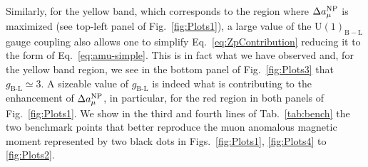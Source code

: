 \documentclass[a4paper,11pt]{article}
\renewcommand{\[}{\left[}
\renewcommand{\]}{\right]}
\newcommand{\U}[1]{\mathrm{U}(1)_{\mathrm{#1}}}			%
\newcommand{\ro}[1]{\textrm{#1}}
\begin{document}
Similarly, for the yellow band, which corresponds to the region where $\Delta a_\mu^{\rm NP}$ is maximized (see top-left panel of Fig.~\ref{fig:Plots1}), a large value of the $\U{B-L}$ gauge coupling also allows one to simplify Eq.~\eqref{eq:ZpContribution} reducing it to the form of Eq.~\eqref{eq:amu-simple}. This is in fact what we have observed and, for the yellow band region, we see in the bottom panel of Fig.~\ref{fig:Plots3} that $g_\ro{B-L} \simeq 3$. A sizeable value of $g_\ro{B-L}$ is indeed what is contributing to the enhancement of $\Delta a_\mu^{\rm NP}$, in particular, for the red region in both panels of Fig.~\ref{fig:Plots1}. We show in the third and fourth lines of Tab.~\ref{tab:bench} the two benchmark points that better reproduce the muon anomalous magnetic moment represented by two black dots in
Figs.~\ref{fig:Plots1}, \ref{fig:Plots4} to \ref{fig:Plots2}.
\end{document}
